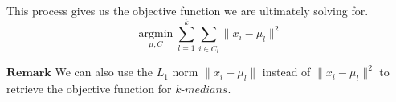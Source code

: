 \documentclass[12pt]{article}
\theoremstyle{plain}
\begin{document}
This process gives us the objective function we are ultimately solving for.
$$\underset{\mu, C}{\operatorname{argmin}}  \sum_{l = 1}^k \sum_{i \in C_l} \| x_i - \mu_l \|^2$$

$\textbf{Remark}$ We can also use the $L_1$ norm $\| x_i - \mu_l \|$ instead of $\| x_i - \mu_l \|^2$ to retrieve the objective function for $\textit{k-medians}$.
\end{document}
